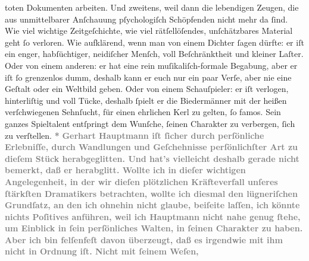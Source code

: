 \begin{ledgroupsized}[t]{13cm}
{{                  toten Dokumenten arbeiten. Und zweitens, weil dann die lebendigen Zeugen, die aus
                  unmittelbarer Anſchauung pſychologiſch Schöpfenden nicht mehr da ſind. Wie viel
                  wichtige Zeitgeſchichte, wie viel rätſellöſendes, unſchätzbares Material geht ſo
                  verloren. Wie aufklärend, wenn man von einem Dichter ſagen dürfte: er iſt ein
                  enger, habſüchtiger, neidiſcher Menſch, voll Beſchränktheit und kleiner Laſter.
                  Oder von einem anderen: er hat eine rein muſikaliſch-formale Begabung, aber er iſt
                  ſo grenzenlos dumm, deshalb kann er euch nur ein paar Verſe, aber nie eine Geſtalt
                  oder ein Weltbild geben. Oder von einem Schauſpieler: er iſt verlogen,
                  hinterliſtig und voll Tücke, deshalb ſpielt er die Biedermänner mit der heißen
                  verſchwiegenen Sehnſucht, für einen ehrlichen Kerl zu gelten, ſo famos. Sein
                  ganzes Spieltalent entſpringt dem Wunſche, ſeinen Charakter zu verbergen, ſich zu
                  verſtellen.}}\pend
           \pstart
           \centering{}\textcolor{gray}{\textbf{*}}\pend
           \pstart
           \noindent{}\textcolor{gray}{\textbf{Gerhart Hauptmann iſt ſicher durch
                  perſönliche Erlebniſſe, durch Wandlungen und Geſchehnisse perſönlichſter Art zu
                  dieſem Stück
                  herabgeglitten. Und hat’s vielleicht deshalb gerade nicht bemerkt, daß er
                  herabglitt. Wollte ich in dieſer wichtigen Angelegenheit, in der wir dieſen
                  plötzlichen Kräfteverfall unſeres ſtärkſten Dramatikers betrachten, wollte ich
                  diesmal den lügneriſchen Grundſatz, an den ich ohnehin nicht glaube, beiſeite
                  laſſen, ich könnte nichts Poſitives anführen, weil ich Hauptmann nicht nahe genug ſtehe, um Einblick in ſein
                  perſönliches Walten, in ſeinen Charakter zu haben. Aber ich bin felſenfeſt davon
                  überzeugt, daß es irgendwie mit ihm nicht in Ordnung iſt. Nicht mit ſeinem Weſen,
}}
\end{ledgroupsized}

